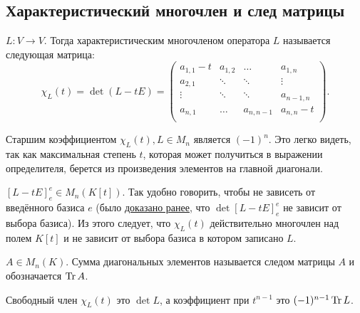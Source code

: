 \subsection{Характеристический многочлен и след матрицы}
\begin{definition}
    $L\colon V\rightarrow V$. Тогда характеристическим многочленом
    оператора $L$ называется следующая матрица:
    \[
        \chi_L(t) = \det(L - tE) = 
        \begin{pmatrix}
            a_{1,1}-t&a_{1,2}&\dots&a_{1,n}\\
            a_{2,1} & \ddots & \ddots& \vdots\\
            \vdots & \ddots & \ddots& a_{n-1,n}\\
            a_{n,1} & \dots & a_{n,n-1}& a_{n,n}-t\\
        \end{pmatrix}
    .\] 
\end{definition}
\begin{remark}
    Старшим коэффициентом $\chi_L(t), L\in M_n$ является $(-1)^n$.
    Это легко видеть, так как максимальная степень $t$, которая может получиться в выражении 
    определителя, берется из произведения элементов на главной диагонали.
\end{remark}
\begin{remark}
    \label{rem:Характеристический многочлен не зависит от базиса}
    $[L - tE]^e_e \in M_n\left(K[t]\right)$. Так удобно говорить,
    чтобы не зависеть от введённого базиса $e$ 
    (было \hyperref[def:определитель отображения]{доказано ранее}, что 
    $\det [L - t E]^e_e$ не зависит от выбора базиса).
    Из этого следует, что $\chi_L(t)$ действительно многочлен над полем $K[t]$ и не зависит
    от выбора базиса в котором записано $L$.
\end{remark}
\begin{definition}
    $A\in M_n(K)$. Сумма диагональных элементов называется следом матрицы $A$ и обозначается $\operatorname{Tr} A$.
\end{definition}
\begin{remark}
    Свободный член $\chi_L(t)$ это $\det L$, а коэффициент при $t^{n-1}$ это $(-1)^{n-1} \operatorname{Tr} L$.
\end{remark}
